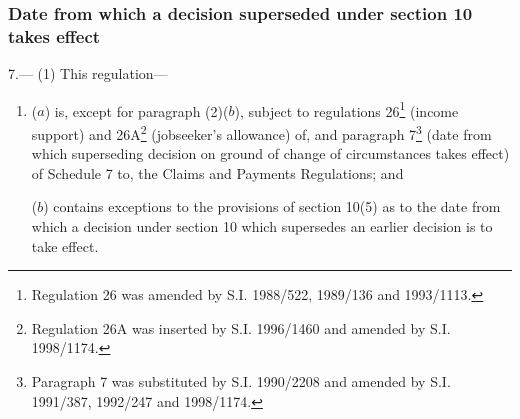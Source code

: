 \documentclass[12pt,a4paper]{article}
\begin{document}
\subsubsection[7. Date from which a decision superseded under section 10 takes effect]{Date from which a decision superseded under section 10 takes effect}

7.—%
%
(1) This regulation---
\begin{enumerate}\item[]
($a$) is, except for paragraph (2)($b$), subject to regulations 26\footnote{\frenchspacing Regulation 26 was amended by S.I. 1988/522, 1989/136 and 1993/1113.} (income support) and 26A\footnote{\frenchspacing Regulation 26A was inserted by S.I. 1996/1460 and amended by S.I. 1998/1174.} (jobseeker’s allowance) of, and paragraph 7\footnote{\frenchspacing Paragraph 7 was substituted by S.I. 1990/2208 and amended by S.I. 1991/387, 1992/247 and 1998/1174.} (date from which superseding decision on ground of change of circumstances takes effect) of Schedule 7 to, the Claims and Payments Regulations; and

($b$) contains exceptions to the provisions of section 10(5) as to the date from which a decision under section 10 which supersedes an earlier decision is to take effect.
\end{enumerate}
\end{document}
